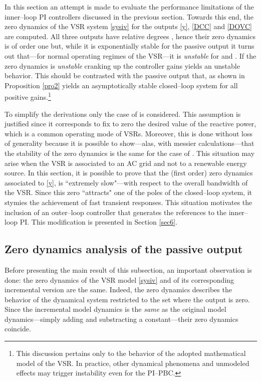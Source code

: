 \documentclass[5p,twocolumn]{elsarticle}
\numberwithin{equation}{section}
\begin{document}
In this section an attempt is made to evaluate the performance limitations of the inner--loop PI controllers discussed in the previous section. Towards this end, the zero dynamics of the VSR system
\eqref{sysiv} for the outputs  \eqref{y},  \eqref{DCC} and  \eqref{DOVC} are computed. All three outputs have relative degrees , hence their zero dynamics is of order one but, while it is
exponentially stable for the passive output  it turns out that---for normal operating regimes of the VSR---it is {\em unstable} for  and . If the {zero dynamics} is {\em unstable} cranking up the
controller gains yields an unstable behavior. This should be contrasted with the passive output  that, as shown in Proposition \ref{pro2} yields an asymptotically stable closed--loop system for all positive
gains.\footnote{This discussion pertains only to the behavior of the adopted mathematical model of the VSR. In practice, other dynamical phenomena and unmodeled effects may trigger instability even for the
PI--PBC.}

To simplify the derivations only the case of  is considered. This assumption is justified since it corresponds to fix to zero the desired value of the reactive power, which is a common operating
mode of VSRs. Moreover, this is done without loss of generality because it is possible to show---alas, with messier calculations---that the stability of the zero dynamics is the same for the case of . This situation may arise when the VSR is associated to an AC grid and not to a renewable energy source. In this section, it is possible to prove that the (first order) zero dynamics associated to \eqref{y}, is ``extremely slow"---with respect to the overall bandwidth of the VSR. Since this zero ``attracts" one of the poles
of the closed--loop system, it stymies the achievement of fast transient responses. This situation motivates the inclusion of an outer--loop controller that generates the references to the inner--loop
PI. This modification is presented in Section \ref{sec6}.
\subsection{Zero dynamics analysis of the passive output }
\label{zerdyn}
Before presenting the main result of this subsection, an important observation is done: the zero dynamics of the VSR model \eqref{sysiv} and of its corresponding incremental version are the same. Indeed,
the zero dynamics describes the behavior of the dynamical system restricted to the set where the output is zero. Since the incremental model dynamics is the {\em same} as the original model dynamics---simply
adding and substracting a constant---their zero dynamics coincide.
\end{document}
